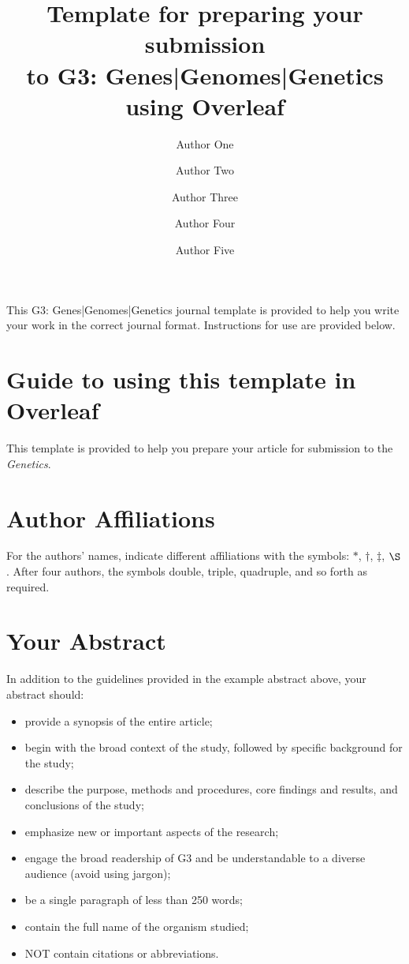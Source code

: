 \documentclass[9pt,twocolumn,twoside]{gsag3jnl}
\title{Template for preparing your submission \\to G3: Genes|Genomes|Genetics using Overleaf}
\author[$\ast$,1]{Author One}
\author[$\dagger$]{Author Two}
\author[$\ddagger$]{Author Three}
\author[$\S$]{Author Four}
\author[$\ast\ast$]{Author Five}
\affil[$\ast$]{Author one affiliation}
\affil[$\dagger$]{Author two affiliation}
\affil[$\ddagger$]{Author three affiliation}
\affil[$\S$]{Author four affiliation}
\affil[$\ast\ast$]{Author five affiliation}
\begin{document}
\maketitle
\thispagestyle{firststyle}
\logomark
\articletypemark
\marginmark
\firstpagefootnote
{}
\vspace{-11pt}%

\noindent This G3: Genes|Genomes|Genetics journal template is provided to help you write your work in the correct journal format. Instructions for use are provided below. 

\section{Guide to using this template in Overleaf}

This template is provided to help you prepare your article for submission to the \textit{Genetics}.

\section{Author Affiliations}

For the authors' names, indicate different affiliations with the symbols: $\ast$, $\dagger$, $\ddagger$, $\S$. After four authors, the symbols double, triple, quadruple, and so forth as required.

\section{Your Abstract}

In addition to the guidelines provided in the example abstract above, your abstract should:

\begin{itemize}
\item provide a synopsis of the entire article;
\item begin with the broad context of the study, followed by specific background for the study;
\item describe the purpose, methods and procedures, core findings and results, and conclusions of the study;
\item emphasize new or important aspects of the research;
\item engage the broad readership of G3 and be understandable to a diverse audience (avoid using jargon);
\item be a single paragraph of less than 250 words;
\item contain the full name of the organism studied;
\item NOT contain citations or abbreviations.
\end{itemize}
\end{document}

